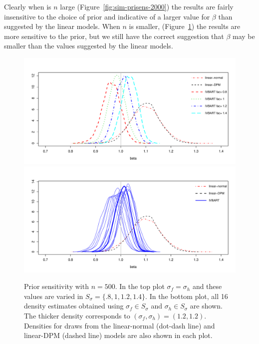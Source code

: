 Clearly when is $n$ large (Figure~\ref{fig:sim-prisens-2000}) the results are fairly insensitive to the choice
of prior and indicative of a larger value for $\beta$ than suggested by the linear models.
When $n$ is smaller, (Figure~\ref{fig:sim-prisens-500}) the results are more sensitive to the prior, 
but we still have the correct suggestion that 
$\beta$ may be smaller than the values suggested by the linear models.


\begin{figure}
\includegraphics[scale=.6]{14-11_1-2_500_sim-prisens_1-way.pdf} \\
\includegraphics[scale=.6]{14-11_1-2_500_sim-prisens_2-way.pdf} 
\caption{%
Prior sensitivity with $n = 500$.
In the top plot $\sigma_f = \sigma_h$ and these values are varied in $S_\sigma = \{.8,1,1.2,1.4\}$.
In the bottom plot, all 16 density estimates obtained using $\sigma_f \in S_\sigma$ and $\sigma_h \in S_\sigma$
are shown.
The thicker density corresponds to $(\sigma_f,\sigma_h) = (1.2, 1.2)$.
Densities for draws from the linear-normal (dot-dash line) and linear-DPM (dashed line) models are also shown in each plot.
\label{fig:sim-prisens-500}}
\end{figure}

